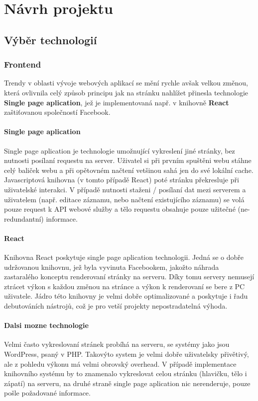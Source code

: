 \chapter{Návrh projektu}

\section{Výběr technologií}

\subsection{Frontend}
Trendy v oblasti vývoje webových aplikací se mění rychle avšak velkou změnou,
která ovlivnila celý způsob principu jak na stránku nahlížet přinesla technologie
\textbf{Single page aplication}, jež je implementovaná
např. v knihovně \textbf{React} zaštiťovanou společností Facebook.

\subsubsection{Single page aplication}
Single page aplication je technologie umožnující vykreslení jiné stránky,
bez nutnosti posílaní requestu na server.
Uživatel si při prvním spuštěni webu stáhne celý baliček webu a 
při opětovném načtení vetšinou sahá jen do své lokální cache.
Javascriptová knihovna (v tomto případě React)
poté stránku překresluje při uživatelské interakci.
V případě nutnosti staženi / posílaní dat mezi serverem a uživatelem
(např. editace záznamu, nebo načtení existujícího záznamu)
se volá pouze request k API webové služby a tělo requestu obsahuje pouze
užitečné (ne-redundantní) informace. 


\subsubsection{React}
Knihovna React poskytuje single page aplication technologii.
Jedná se o dobře udržovanou knihovnu, jež byla vyvinuta Facebookem, 
jakožto náhrada zastaralého konceptu renderovaní stránky na serveru.
Díky tomu servery nemusejí ztrácet výkon s každou změnou na stránce a
výkon k renderovaní se bere z PC uživatele.
Jádro této knihovny je velmi dobře optimalizované a poskytuje i řadu
debutováních nástrojů, což je pro vetší projekty nepostradatelná výhoda.  


\subsubsection{Dalsi mozne technologie}
Velmi často vykreslovaní stránek probíhá na serveru, se systémy jako jsou 
WordPress, psaný v PHP. Takovýto system je velmi dobře uživatelsky přivětivý,
ale z pohledu výkonu má velmi obrovský overhead. 
V případě implementace knihovního systému by to znamenalo vykreslovat
celou stránku (hlavičku, tělo i zápatí) na serveru,
na druhé straně single page aplication nic nerenderuje,
pouze pošle požadované informace.


